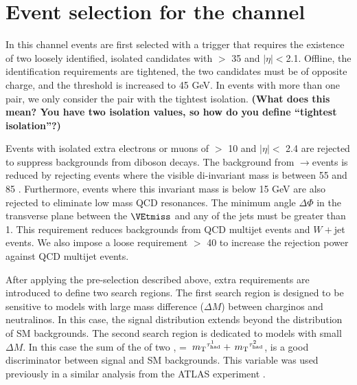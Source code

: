 \section{\texorpdfstring{Event selection for the \Tau\Tau channel}{Event selection for the tau-tau channel}}
\label{sect:tauTauCuts}
In this channel events are first selected with a trigger \cite{CMS:2013hoa,Chatrchyan:2012xi,Chatrchyan:2011nv}
that requires the existence of
two loosely identified, isolated \Tau candidates with \PT $>$ 35 \GeV and $|\eta|<$2.1.   Offline,
the \Tau identification requirements are tightened, the two \Tau candidates must be of
opposite charge, and the \PT threshold is increased to 45 GeV.
In events with more than one \Tau\Tau pair, we only consider the pair with the tightest isolation.
{\bf (What does this mean?  You have two isolation values, so how do you define ``tightest isolation''?)}

Events with isolated extra electrons or muons of \PT $>$ 10 \GeV and $|\eta| <$ 2.4 
are rejected to suppress %
backgrounds from diboson decays.
The background from \Z$\rightarrow$\Tau\Tau events is reduced by rejecting events where the visible
di-\Tau invariant mass is between 55 and 85 \GeV.  Furthermore, events where this invariant mass is below 15 GeV
are also rejected to eliminate low mass QCD resonances.
The minimum angle $\Delta \Phi$
in the transverse plane between the $\VEtmiss$ and any of the jets %
must be greater than 1.  This requirement reduces backgrounds from QCD multijet events and $W+$jet events.
We also impose a loose requirement \mttwo $>$ 40 \GeV to increase the rejection power against QCD multijet events.


After applying the pre-selection described above,
extra requirements are introduced to define two search regions.
The first search region is designed to be sensitive to models
with large mass difference ($\Delta M$) between charginos and neutralinos.
In this case, the \mttwo signal distribution extends beyond the 
distribution of SM backgrounds.
The second search region is dedicated to models with small $\Delta M$.  In this case
the sum of the \mt of two \Tau, \SumMT = $\,{m_{\rm T}}^{\tau_{\rm had}^1} + \,{m_{\rm T}}^{\tau_{\rm had}^2}$, is a good discriminator
between signal and SM backgrounds. 
This variable was used previously in a similar analysis from the ATLAS experiment \cite{Aad:2014yka}.


